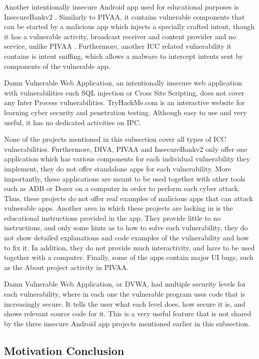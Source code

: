 		Another intentionally insecure Android app used for educational purposes is InsecureBankv2 \cite{android_insecure_bank_github}. Similarly to PIVAA, it contains vulnerable components that can be started by a malicious app which injects a specially crafted intent, though it has a vulnerable activity, broadcast receiver and content provider and no service, unlike PIVAA \cite{android_insecure_bank_walkthrough}. Furthermore, another ICC related vulnerability it contains is intent sniffing, which allows a malware to intercept intents sent by components of the vulnerable app.
		
		Damn Vulnerable Web Application, an intentionally insecure web application with vulnerabilities such SQL injection or Cross Site Scripting, does not cover any Inter Process vulnerabilities. TryHackMe.com is an interactive website for learning cyber security and penetration testing. Although easy to use and very useful, it has no dedicated activities on IPC.
		
		None of the projects mentioned in this subsection cover all types of ICC vulnerabilities. Furthermore, DIVA, PIVAA and InsecureBankv2 only offer one application which has various components for each individual vulnerability they implement, they do not offer standalone apps for each vulnerability. More importantly, these applications are meant to be used together with other tools such as ADB or Dozer on a computer in order to perform each cyber attack. Thus, these projects do not offer real examples of malicious apps that can attack vulnerable apps. Another area in which these projects are lacking in is the educational instructions provided in the app. They provide little to no instructions, and only some hints as to how to solve each vulnerability, they do not show detailed explanations and code examples of the vulnerability and how to fix it. In addition, they do not provide much interactivity, and have to be used together with a computer. Finally, some of the apps contain major UI bugs, such as the About project activity in PIVAA.
		
		Damn Vulnerable Web Application, or DVWA, had multiple security levels for each vulnerability, where in each one the vulnerable program uses code that is increasingly secure. It tells the user what each level does, how secure it is, and shows relevant source code for it. This is a very useful feature that is not shared by the three insecure Android app projects mentioned earlier in this subsection.
		
		\subsection{Motivation Conclusion}
		
